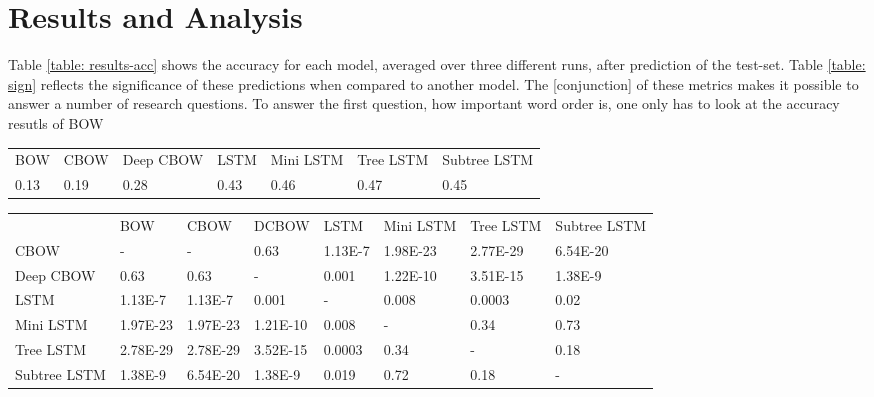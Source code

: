 \section{Results and Analysis}
\label{sec: results}
Table \ref{table: results-acc} shows the accuracy for each model, averaged over
three different runs, after prediction of the test-set. Table \ref{table: sign}
reflects the significance of these predictions when compared to another model.
The [conjunction] of these metrics makes it possible to answer a number of
research questions. To answer the first question, how important word order is,
one only has to look at the accuracy resutls of BOW

\begin{table*}[]
    \centering
    \begin{tabular}{lllllll}
    BOW  & CBOW & Deep CBOW & LSTM & Mini LSTM & Tree LSTM & Subtree LSTM \\
    0.13 & 0.19 & 0.28      & 0.43 & 0.46      & 0.47      & 0.45        
    \end{tabular}
    \label{table: results-acc}
    \caption{Test-set accuracies of three models averaged over 3 seeds}
\end{table*}


\begin{table*}[]
    \begin{tabular}{llllllll}
                     & BOW     & CBOW     & DCBOW     & LSTM    & Mini LSTM & Tree LSTM & Subtree LSTM \\
        CBOW         & -        & -        & 0.63      & 1.13E-7 & 1.98E-23  & 2.77E-29  & 6.54E-20     \\
        Deep CBOW    & 0.63     & 0.63     & -         & 0.001   & 1.22E-10  & 3.51E-15  & 1.38E-9      \\
        LSTM         & 1.13E-7  & 1.13E-7  & 0.001     & -       & 0.008     & 0.0003    & 0.02         \\
        Mini LSTM    & 1.97E-23 & 1.97E-23 & 1.21E-10  & 0.008   & -         & 0.34      & 0.73         \\
        Tree LSTM    & 2.78E-29 & 2.78E-29 & 3.52E-15  & 0.0003  & 0.34      & -         & 0.18         \\
        Subtree LSTM & 1.38E-9  & 6.54E-20 & 1.38E-9   & 0.019   & 0.72      & 0.18      & -           
        \end{tabular}
    \label{table: sign}
    \caption{Significance of accuracy tests}
\end{table*}